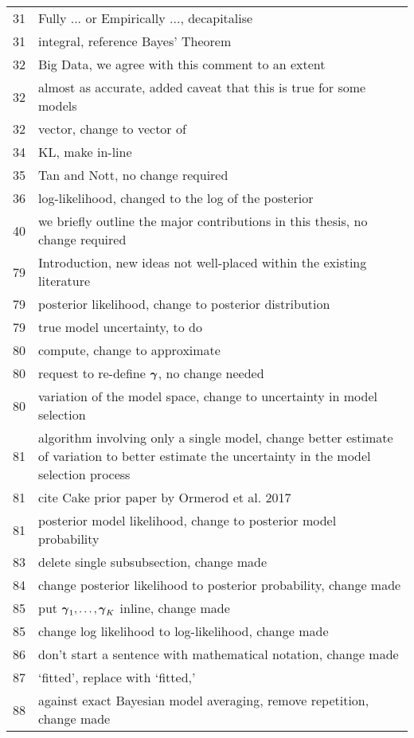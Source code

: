 \documentclass{amsart}
\begin{document}
\begin{tabular}{cl}
 31  &  Fully ... or Empirically ..., decapitalise\\
 31  &  integral, reference Bayes' Theorem\\
 32  &  Big Data, we agree with this comment to an extent\\
 32  &  almost as accurate, added caveat that this is true for some models\\
 32  &  vector, change to vector of\\
 34  &  KL, make in-line\\
 35  &  Tan and Nott, no change required\\
 36  &  log-likelihood, changed to the log of the posterior\\
 40  &  we briefly outline the major contributions in this thesis, no
			change required\\
 79  &  Introduction, new ideas not well-placed within the existing
			literature\\
 79  &  posterior likelihood, change to posterior distribution\\
 79  &  true model uncertainty, to do\\
 80  &  compute, change to approximate\\
 80  &  request to re-define ${\boldsymbol \gamma}$, no change needed\\
 80  &  variation of the model space, change to uncertainty in model
			selection\\
 81  &  algorithm involving only a single model, change better estimate of
variation to better estimate the uncertainty in the model selection process\\
 81  &  cite Cake prior paper by Ormerod et al. 2017\\
 81  &  posterior model likelihood, change to posterior model probability\\
 83  &  delete single subsubsection, change made\\
 84  &  change posterior likelihood to posterior probability, change made\\
 85  &  put ${\boldsymbol \gamma}_1, \ldots, {\boldsymbol \gamma}_K$ inline, change made\\
 85  &  change log likelihood to log-likelihood, change made\\
 86  &  don't start a sentence with mathematical notation, change made\\
 87  &  `fitted', replace with `fitted,'\\
 88  &  against exact Bayesian model averaging, remove repetition, change
			made\\

\end{tabular}
\end{document}
